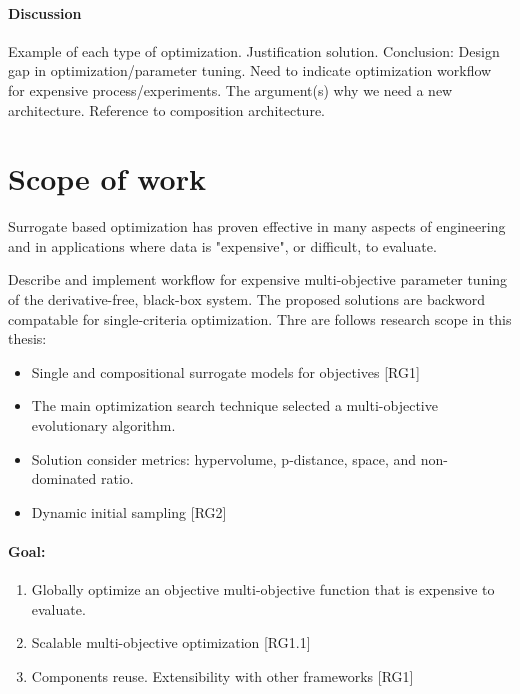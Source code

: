         \paragraph{Discussion}


        Example of each type of optimization. Justification solution.
        Conclusion: Design gap in optimization/parameter tuning. 
        Need to indicate optimization workflow for expensive process/experiments. 
        The argument(s) why we need a new architecture. Reference to composition architecture.




    \section{Scope of work}
        Surrogate based optimization has proven effective in many aspects of engineering and in applications where data is "expensive", or difficult, to evaluate.

        Describe and implement workflow for expensive multi-objective parameter tuning of the derivative-free, black-box system. The proposed solutions are backword compatable for single-criteria optimization. 
        Thre are follows research scope in this thesis:
        \begin{itemize}
            \item Single and compositional surrogate models for objectives [RG1] 
            \item The main optimization search technique selected a multi-objective evolutionary algorithm.
            \item Solution consider metrics: hypervolume, p-distance, space, and non-dominated ratio.
            \item Dynamic initial sampling [RG2] 
        \end{itemize}

        \paragraph{Goal:}
        \begin{enumerate}
            \item Globally optimize an objective multi-objective function that is expensive to evaluate.
            \item Scalable multi-objective optimization [RG1.1]
            \item Components reuse. Extensibility with other frameworks [RG1]
        \end{enumerate}


